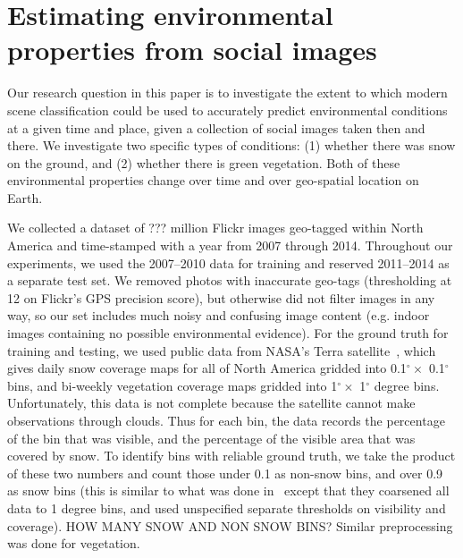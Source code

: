 \section{Estimating environmental properties from social images}

Our research question in this paper is to investigate the extent to
which modern scene classification could be used to accurately predict
environmental conditions at a given time and place, given a collection
of social images taken then and there. We investigate two specific
types of conditions: (1) whether there was snow on the ground, and (2)
whether there is green vegetation. Both of these environmental 
properties change over time and over geo-spatial location on Earth.


We collected a dataset of ??? million Flickr images
geo-tagged within North America and time-stamped with a year from 2007
through 2014. Throughout our experiments, we used the 2007--2010 data
for training and reserved 2011--2014 as a separate test set. We
removed photos with inaccurate geo-tags (thresholding at 12 on
Flickr's GPS precision score), but otherwise did not filter images in
any way, so our set includes much noisy and confusing image content
(e.g. indoor images containing no possible environmental evidence).
For the ground truth for training and testing, we used public data
from NASA's Terra satellite~\cite{modissnow, modisveg}, which gives daily snow
coverage maps for all of North America gridded into 0.1$^\circ \times$
0.1$^\circ$ bins, and bi-weekly vegetation coverage maps gridded into
1$^\circ \times$ 1$^\circ$ degree bins. Unfortunately, this data is
not complete because the satellite cannot make observations through
clouds. Thus for each bin, the data records the percentage of the bin
that was visible, and the percentage of the visible area that was
covered by snow. To identify bins with reliable ground truth, we take
the product of these two numbers and count those under 0.1 as non-snow
bins, and over 0.9 as snow bins (this is similar to what was done
in~\cite{ecology2012www} except that they coarsened all data to 1
degree bins, and used unspecified separate thresholds on visibility and
coverage).  HOW MANY SNOW AND NON SNOW BINS? Similar preprocessing
was done for vegetation.



